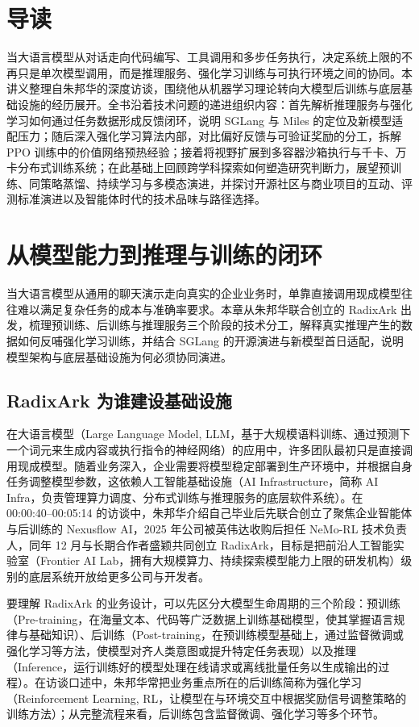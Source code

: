 \documentclass[UTF8,a4paper,11pt,fontset=fandol]{ctexart}
\begin{document}
\section*{导读}
当大语言模型从对话走向代码编写、工具调用和多步任务执行，决定系统上限的不再只是单次模型调用，而是推理服务、强化学习训练与可执行环境之间的协同。本讲义整理自朱邦华的深度访谈，围绕他从机器学习理论转向大模型后训练与底层基础设施的经历展开。全书沿着技术问题的递进组织内容：首先解析推理服务与强化学习如何通过任务数据形成反馈闭环，说明 SGLang 与 Miles 的定位及新模型适配压力；随后深入强化学习算法内部，对比偏好反馈与可验证奖励的分工，拆解 PPO 训练中的价值网络预热经验；接着将视野扩展到多容器沙箱执行与千卡、万卡分布式训练系统；在此基础上回顾跨学科探索如何塑造研究判断力，展望预训练、同策略蒸馏、持续学习与多模态演进，并探讨开源社区与商业项目的互动、评测标准演进以及智能体时代的技术品味与路径选择。
\section{从模型能力到推理与训练的闭环}
当大语言模型从通用的聊天演示走向真实的企业业务时，单靠直接调用现成模型往往难以满足复杂任务的成本与准确率要求。本章从朱邦华联合创立的 RadixArk 出发，梳理预训练、后训练与推理服务三个阶段的技术分工，解释真实推理产生的数据如何反哺强化学习训练，并结合 SGLang 的开源演进与新模型首日适配，说明模型架构与底层基础设施为何必须协同演进。
\subsection{RadixArk 为谁建设基础设施}
在大语言模型（Large Language Model, LLM，基于大规模语料训练、通过预测下一个词元来生成内容或执行指令的神经网络）的应用中，许多团队最初只是直接调用现成模型。随着业务深入，企业需要将模型稳定部署到生产环境中，并根据自身任务调整模型参数，这依赖人工智能基础设施（AI Infrastructure，简称 AI Infra，负责管理算力调度、分布式训练与推理服务的底层软件系统）。在 00:00:40–00:05:14 的访谈中，朱邦华介绍自己毕业后先联合创立了聚焦企业智能体与后训练的 Nexusflow AI，2025 年公司被英伟达收购后担任 NeMo-RL 技术负责人，同年 12 月与长期合作者盛颖共同创立 RadixArk，目标是把前沿人工智能实验室（Frontier AI Lab，拥有大规模算力、持续探索模型能力上限的研发机构）级别的底层系统开放给更多公司与开发者。

要理解 RadixArk 的业务设计，可以先区分大模型生命周期的三个阶段：预训练（Pre-training，在海量文本、代码等广泛数据上训练基础模型，使其掌握语言规律与基础知识）、后训练（Post-training，在预训练模型基础上，通过监督微调或强化学习等方法，使模型对齐人类意图或提升特定任务表现）以及推理（Inference，运行训练好的模型处理在线请求或离线批量任务以生成输出的过程）。在访谈口述中，朱邦华常把业务重点所在的后训练简称为强化学习（Reinforcement Learning, RL，让模型在与环境交互中根据奖励信号调整策略的训练方法）；从完整流程来看，后训练包含监督微调、强化学习等多个环节。
\end{document}
